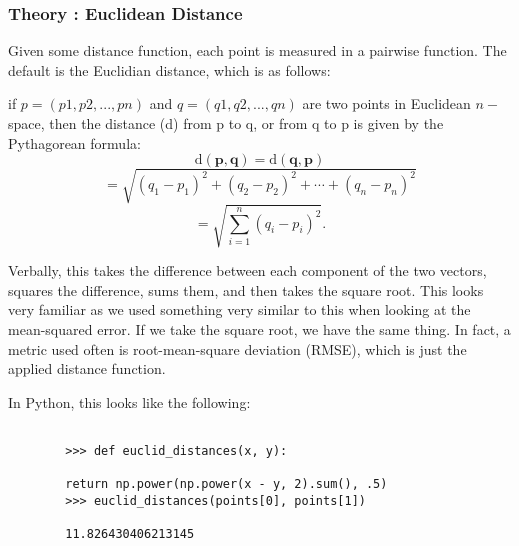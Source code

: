 \documentclass[SKL-MASTER.tex]{subfiles}
\begin{document}
	\newpage
	\subsubsection*{Theory : Euclidean Distance} %
	Given some distance function, each point is measured in a pairwise function. The default is
	the Euclidian distance, which is as follows:
	
	if $p = (p1, p2,..., pn)$ and $q = (q1, q2,..., qn)$ are two points in Euclidean $n-$space, then the distance (d) from p to q, or from q to p is given by the Pythagorean formula:
	\[\mathrm{d}(\mathbf{p},\mathbf{q}) = \mathrm{d}(\mathbf{q},\mathbf{p}) \]\[ = \sqrt{(q_1-p_1)^2 + (q_2-p_2)^2 + \cdots + (q_n-p_n)^2} \]
	\[ = \sqrt{\sum_{i=1}^n (q_i-p_i)^2}.\]
	
	Verbally, this takes the difference between each component of the two vectors, squares the
	difference, sums them, and then takes the square root. This looks very familiar as we used
	something very similar to this when looking at the mean-squared error. If we take the square
	root, we have the same thing. In fact, a metric used often is root-mean-square deviation
	(RMSE), which is just the applied distance function.
	
	In Python, this looks like the following:
	\begin{framed}
		\begin{verbatim}
		
		>>> def euclid_distances(x, y):
		
		return np.power(np.power(x - y, 2).sum(), .5)
		>>> euclid_distances(points[0], points[1])
		
		11.826430406213145
		\end{verbatim}
	\end{framed}
\end{document}
